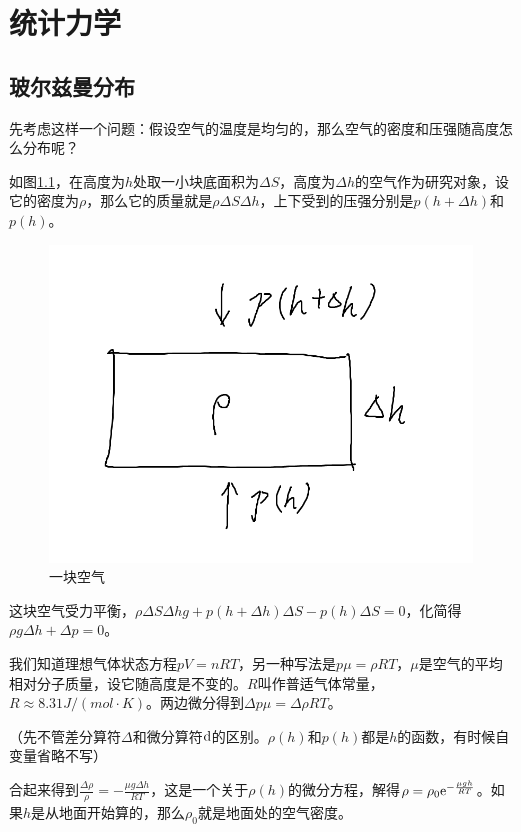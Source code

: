 \chapter{统计力学}
\section{玻尔兹曼分布}
先考虑这样一个问题：假设空气的温度是均匀的，那么空气的密度和压强随高度怎么分布呢？

如图\ref{fig-air-block}，在高度为$h$处取一小块底面积为$\Delta S$，高度为$\Delta h$的空气作为研究对象，设它的密度为$\rho$，那么它的质量就是$\rho \Delta S \Delta h$，上下受到的压强分别是$p(h+\Delta h)$和$p(h)$。
\begin{figure}[htb]
\centering
\includegraphics[scale=0.5]{fig/air-block.png}
\caption{一块空气}
\label{fig-air-block}
\end{figure}

这块空气受力平衡，$\rho \Delta S \Delta h g+p(h+\Delta h) \Delta S-p(h) \Delta S=0$，化简得$\rho g \Delta h+\Delta p=0$。

我们知道理想气体状态方程$p V=n R T$，另一种写法是$p \mu=\rho R T$，$\mu$是空气的平均相对分子质量，设它随高度是不变的。$R$叫作普适气体常量， $R \approx 8.31 \unit{J/(mol \cdot K)}$。两边微分得到$\Delta p \mu=\Delta \rho R T$。

（先不管差分算符$\Delta$和微分算符$\mathop{}\!\mathrm{d}$的区别。$\rho(h)$和$p(h)$都是$h$的函数，有时候自变量省略不写）

合起来得到$\frac{\Delta \rho}{\rho}=-\frac{\mu g \Delta h}{R T}$，这是一个关于$\rho(h)$的微分方程，解得$\rho=\rho_0 \mathrm{e}^{-\frac{\mu g h}{R T}}$。如果$h$是从地面开始算的，那么$\rho_0$就是地面处的空气密度。

